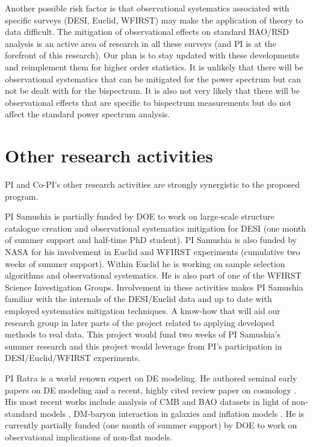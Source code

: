 Another possible risk factor is that observational systematics associated with
specific surveys (DESI, Euclid, WFIRST) may make the application of theory to
data difficult. The mitigation of observational effects on standard BAO/RSD
analysis is an active area of research in all these surveys (and PI is at the
forefront of this research). Our plan is to stay updated with these
developments and reimplement them for higher order statistics. It is unlikely
that there will be observational systematics that can be mitigated for the
power spectrum but can not be dealt with for the bispectrum. It is also not
very likely that there will be observational effects that are specific to
bispectrum measurements but do not affect the standard power spectrum analysis.

\section{Other research activities}

PI and Co-PI's other research activities are strongly synergistic to the
proposed program.

PI Samushia is partially funded by DOE to work on large-scale structure
catalogue creation and observational systematics mitigation for DESI (one month of
summer support and half-time PhD student). PI Samushia is also funded by NASA
for his involvement in Euclid and WFIRST experiments (cumulative two weeks of
summer support). Within Euclid he is working on sample selection algorithms
and observational systematics. He is also part of one of the WFIRST Science
Investigation Groups. Involvement in these activities makes PI Samushia
familiar with  the internals of the DESI/Euclid data and up to date with
employed systematics mitigation techniques. A know-how that will aid our
research group in later parts of the project related to applying  developed
methods to real data. This project would fund two weeks of PI Samushia's
summer research and this project would leverage from PI's participation in
DESI/Euclid/WFIRST experiments.

PI Ratra is a world renown expert on DE modeling. He authored seminal early
papers on DE modeling \cite{1988ApJ...325L..17P,1988PhRvD..37.3406R} and a
recent, highly cited review paper on cosmology \cite{2003RvMP...75..559P}.  His
most recent works include analysis of CMB and BAO datasets in light of
non-standard models
\cite{2018arXiv180305522P,2018arXiv180707421P,2018arXiv180903598P,2018MNRAS.479.4566M,2018MNRAS.480..759R},
DM-baryon interaction in galaxies \cite{2018arXiv180905938Y} and inflation
models \cite{2017PhRvD..96j3534R}. He is currently partially funded (one month
of summer support) by DOE to work on observational implications of non-flat
models.

